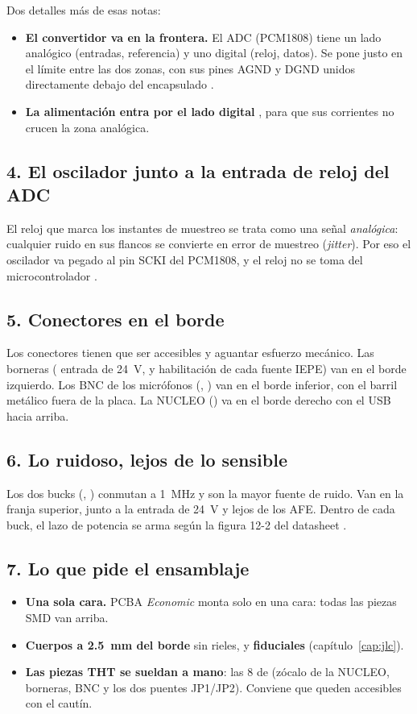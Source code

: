 Dos detalles más de esas notas:
\begin{itemize}
  \item \textbf{El convertidor va en la frontera.} El ADC (PCM1808) tiene un lado analógico (entradas, referencia) y
        uno digital (reloj, datos). Se pone justo en el límite entre las dos zonas, con sus pines AGND y DGND unidos
        directamente debajo del encapsulado .
  \item \textbf{La alimentación entra por el lado digital} , para que sus corrientes no crucen la
        zona analógica.
\end{itemize}

\subsection{4. El oscilador junto a la entrada de reloj del ADC}
El reloj que marca los instantes de muestreo se trata como una señal \emph{analógica}: cualquier ruido en sus
flancos se convierte en error de muestreo (\emph{jitter}). Por eso el oscilador  va pegado al pin SCKI del
PCM1808, y el reloj no se toma del microcontrolador \copia[MT-031].

\subsection{5. Conectores en el borde}
Los conectores tienen que ser accesibles y aguantar esfuerzo mecánico. Las borneras ( entrada de
\SI{24}{\volt},  y  habilitación de cada fuente IEPE) van en el borde izquierdo. Los BNC de los
micrófonos (, ) van en el borde inferior, con el barril metálico fuera de la placa. La NUCLEO
() va en el borde derecho con el USB hacia arriba.

\subsection{6. Lo ruidoso, lejos de lo sensible}
Los dos bucks (, ) conmutan a \SI{1}{\mega\hertz} y son la mayor fuente de ruido. Van en la franja
superior, junto a la entrada de \SI{24}{\volt} y lejos de los AFE. Dentro de cada buck, el lazo de potencia se
arma según la figura 12-2 del datasheet .

\subsection{7. Lo que pide el ensamblaje}
\begin{itemize}
  \item \textbf{Una sola cara.} PCBA \emph{Economic} monta solo en una cara: todas las piezas SMD van arriba.
  \item \textbf{Cuerpos a \SI{2.5}{\milli\meter} del borde} sin rieles, y \textbf{fiduciales} (capítulo~\ref{cap:jlc}).
  \item \textbf{Las piezas THT se sueldan a mano}: las 8 de  (zócalo de la
        NUCLEO, borneras, BNC y los dos puentes JP1/JP2). Conviene que queden accesibles con el cautín.
\end{itemize}

